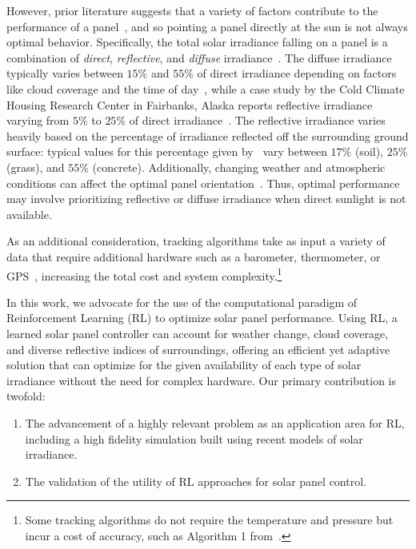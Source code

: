 \documentclass{article}
\begin{document}
However, prior literature suggests that a variety of factors contribute to the performance of a panel~\cite{King2001}, and so pointing a panel directly at the sun is not always optimal behavior. Specifically, the total solar irradiance falling on a panel is a combination of {\it direct}, {\it reflective}, and {\it diffuse} irradiance~\cite{Benghanem2011}. The diffuse irradiance typically varies between $15\%$ and $55\%$ of direct irradiance depending on factors like cloud coverage and the time of day~\cite{peterson1981ratio}, while a case study by the Cold Climate Housing Research Center in Fairbanks, Alaska reports reflective irradiance varying from $5\%$ to $25\%$ of direct irradiance~\cite{colgan2010}. The reflective irradiance varies heavily based on the percentage of irradiance reflected off the surrounding ground surface: typical values for this percentage given by~\citet{mcevoy2003practical} vary between $17\%$ (soil), $25\%$ (grass), and $55\%$ (concrete). Additionally, changing weather and atmospheric conditions can affect the optimal panel orientation~\cite{Kelly2009}. Thus, optimal performance may involve prioritizing reflective or diffuse irradiance when direct sunlight is not available.

As an additional consideration, tracking algorithms take as input a variety of data that require additional hardware such as a barometer, thermometer, or GPS~\cite{Grena2012}, increasing the total cost and system complexity.\footnote{Some tracking algorithms do not require the temperature and pressure but incur a cost of accuracy, such as Algorithm 1 from~\citet{Grena2012}.}

In this work, we advocate for the use of the computational paradigm of Reinforcement Learning (RL) to optimize solar panel performance. Using RL, a learned solar panel controller can account for weather change, cloud coverage, and diverse reflective indices of surroundings, offering an efficient yet adaptive solution that can optimize for the given availability of each type of solar irradiance without the need for complex hardware. Our primary contribution is twofold:
\begin{enumerate}
\item The advancement of a highly relevant problem as an application area for RL, including a high fidelity simulation built using recent models of solar irradiance.
\item The validation of the utility of RL approaches for solar panel control.
\end{enumerate}
\end{document}
